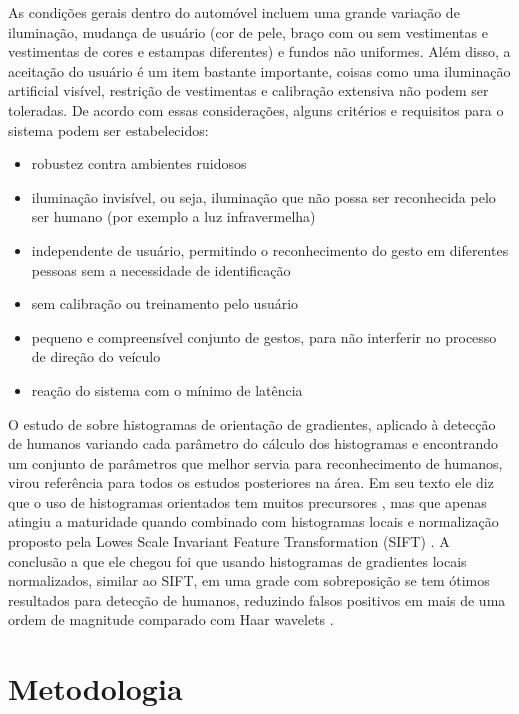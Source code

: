 As condições gerais dentro do automóvel incluem uma grande variação de iluminação, mudança de usuário (cor de pele, braço com ou sem vestimentas e vestimentas de cores e estampas diferentes) e fundos não uniformes. Além disso, a aceitação do usuário é um item bastante importante, coisas como uma iluminação artificial visível, restrição de vestimentas e calibração extensiva não podem ser toleradas. De acordo com essas considerações, alguns critérios e requisitos para o sistema podem ser estabelecidos:

\begin{itemize}
\item robustez contra ambientes ruidosos
\item iluminação invisível, ou seja, iluminação que não possa ser reconhecida pelo ser humano (por exemplo a luz infravermelha)
\item independente de usuário, permitindo o reconhecimento do gesto em diferentes pessoas sem a necessidade de identificação
\item sem calibração ou treinamento pelo usuário
\item pequeno e compreensível conjunto de gestos, para não interferir no processo de direção do veículo
\item reação do sistema com o mínimo de latência
\end{itemize}

O estudo de  sobre histogramas de orientação de gradientes, aplicado à detecção de humanos variando cada parâmetro do cálculo dos histogramas e encontrando um conjunto de parâmetros que melhor servia para reconhecimento de humanos, virou referência para todos os estudos posteriores na área. Em seu texto ele diz que o uso de histogramas orientados tem muitos precursores \cite{freeman1995orientation, freeman1996computer}, mas que apenas atingiu a maturidade quando combinado com histogramas locais e normalização proposto pela Lowes Scale Invariant Feature Transformation (SIFT) \cite{lowe2004distinctive}. A conclusão a que ele chegou foi que usando histogramas de gradientes locais normalizados, similar ao SIFT, em uma grade com sobreposição se tem ótimos resultados para detecção de humanos, reduzindo falsos positivos em mais de uma ordem de magnitude comparado com Haar wavelets \cite{papageorgiou2000trainable}.

\section{Metodologia}

